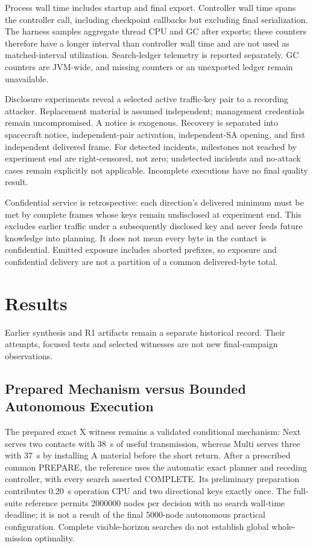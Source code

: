 \documentclass[conference]{IEEEtran}
\begin{document}
Process wall time includes startup and final export. Controller wall time spans the controller call, including checkpoint callbacks but excluding final serialization. The harness samples aggregate thread CPU and GC after exports; these counters therefore have a longer interval than controller wall time and are not used as matched-interval utilization. Search-ledger telemetry is reported separately. GC counters are JVM-wide, and missing counters or an unexported ledger remain unavailable.

Disclosure experiments reveal a selected active traffic-key pair to a recording attacker. Replacement material is assumed independent; management credentials remain uncompromised. A notice is exogenous. Recovery is separated into spacecraft notice, independent-pair activation, independent-SA opening, and first independent delivered frame. For detected incidents, milestones not reached by experiment end are right-censored, not zero; undetected incidents and no-attack cases remain explicitly not applicable. Incomplete executions have no final quality result.

Confidential service is retrospective: each direction's delivered minimum must be met by complete frames whose keys remain undisclosed at experiment end. This excludes earlier traffic under a subsequently disclosed key and never feeds future knowledge into planning. It does not mean every byte in the contact is confidential. Emitted exposure includes aborted prefixes, so exposure and confidential delivery are not a partition of a common delivered-byte total.

\section{Results}
Earlier synthesis and R1 artifacts remain a separate historical record. Their attempts, focused tests and selected witnesses are not new final-campaign observations.


\subsection{Prepared Mechanism versus Bounded Autonomous Execution}
The prepared exact X witness remains a validated conditional mechanism: Next serves two contacts with 38~s of useful transmission, whereas Multi serves three with 37~s by installing A material before the short return. After a prescribed common PREPARE, the reference uses the automatic exact planner and receding controller, with every search asserted COMPLETE. Its preliminary preparation contributes 0.20~s operation CPU and two directional keys exactly once. The full-suite reference permits 2000000 nodes per decision with no search wall-time deadline; it is not a result of the final 5000-node autonomous practical configuration. Complete visible-horizon searches do not establish global whole-mission optimality.
\end{document}
